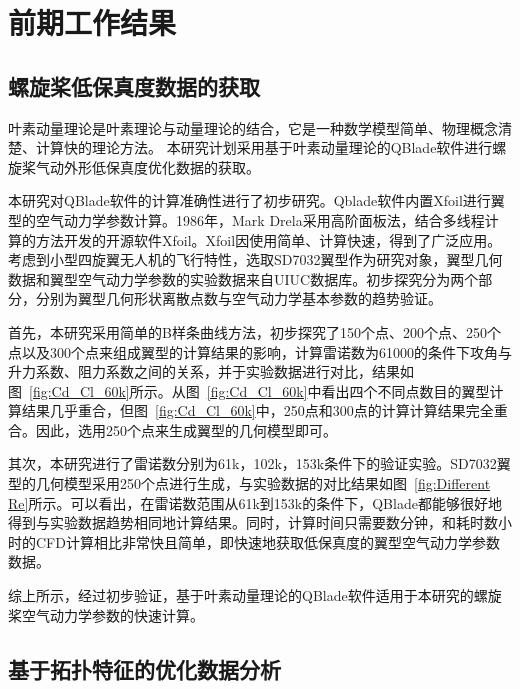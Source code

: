 \vspace{0.8em}
\section{前期工作结果}\label{Sec: previous work}
\vspace{0.8em}

\vspace{0.8em}
\subsection{螺旋桨低保真度数据的获取}\label{analysis}
\vspace{0.8em}

叶素动量理论是叶素理论与动量理论的结合，它是一种数学模型简单、物理概念清楚、计算快的理论方法。
本研究计划采用基于叶素动量理论的QBlade软件\cite{Marten2013QBLADEA}进行螺旋桨气动外形低保真度优化数据的获取。

本研究对QBlade软件的计算准确性进行了初步研究。Qblade软件内置Xfoil进行翼型的空气动力学参数计算。1986年，Mark Drela采用高阶面板法，结合多线程计算的方法开发的开源软件Xfoil\cite{Drela1989XFOI}。Xfoil因使用简单、计算快速，得到了广泛应用\cite{Akram2021}。
考虑到小型四旋翼无人机的飞行特性，选取SD7032翼型作为研究对象\cite{Liang2022}，翼型几何数据和翼型空气动力学参数的实验数据来自UIUC数据库\cite{Selig1995}。初步探究分为两个部分，分别为翼型几何形状离散点数与空气动力学基本参数的趋势验证。

首先，本研究采用简单的B样条曲线方法，初步探究了150个点、200个点、250个点以及300个点来组成翼型的计算结果的影响，计算雷诺数为61000的条件下攻角与升力系数、阻力系数之间的关系，并于实验数据进行对比，结果如图~\ref{fig:Cd_Cl_60k}所示。从图~\ref{fig:Cd_Cl_60k}中看出四个不同点数目的翼型计算结果几乎重合，但图~\ref{fig:Cd_Cl_60k}中，250点和300点的计算计算结果完全重合。因此，选用250个点来生成翼型的几何模型即可。


其次，本研究进行了雷诺数分别为61k，102k，153k条件下的验证实验。SD7032翼型的几何模型采用250个点进行生成，与实验数据的对比结果如图~\ref{fig:Different Re}所示。可以看出，在雷诺数范围从61k到153k的条件下，QBlade都能够很好地得到与实验数据趋势相同地计算结果。同时，计算时间只需要数分钟，和耗时数小时的CFD计算相比非常快且简单，即快速地获取低保真度的翼型空气动力学参数数据。

综上所示，经过初步验证，基于叶素动量理论的QBlade软件适用于本研究的螺旋桨空气动力学参数的快速计算。

\vspace{0.8em}
\subsection{基于拓扑特征的优化数据分析}\label{topology analysis}
\vspace{0.8em}

